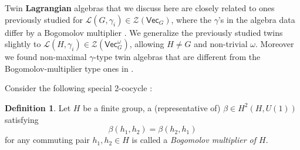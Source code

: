 \documentclass[aps,twocolumn,prx,floatfix,preprintnumbers, nofootinbib,10pt]{revtex4-2}
\numberwithin{equation}{section}
\theoremstyle{definition}
\newtheorem{definition}[theorem]{Definition}
\newcommand{\cL}{\mathcal{L}}
\newcommand{\cZ}{\mathcal{Z}}
\renewcommand{\Vec}{\mathsf{Vec}}
\begin{document}
Twin {\bf Lagrangian} algebras that we discuss here are closely related to ones previously studied for $\cL(G, \gamma_i)\in\cZ(\Vec_G)$, where the $\gamma$'s in the algebra data differ by a Bogomolov multiplier \cite{Pollmann:2012,Davydov:2013xov, Cong:2017ffh, Kobayashi:2025ykb,Kobayashi:2025pxs}. We generalize the previously studied twins slightly to $\cL(H, \gamma_i)\in \cZ(\Vec_G^\omega)$, allowing $H\neq G$ and non-trivial $\omega$. Moreover we found non-maximal $\gamma$-type twin algebras that are different from the Bogomolov-multiplier type ones in .



Consider the following special 2-cocycle \cite{FABogomolov_1988, Davydov:2013xov}:
\begin{definition}
    Let $H$ be a finite group, a (representative of) $\beta\in H^2(H,U(1))$ satisfying
    \begin{equation}
    \label{eqn:Bogomolov_multiplier}
        \beta(h_1,h_2)=\beta(h_2,h_1)
    \end{equation}
    for any commuting pair $h_1,h_2\in H$ is called a \emph{Bogomolov multiplier of $H$}.
\end{definition}
\end{document}
